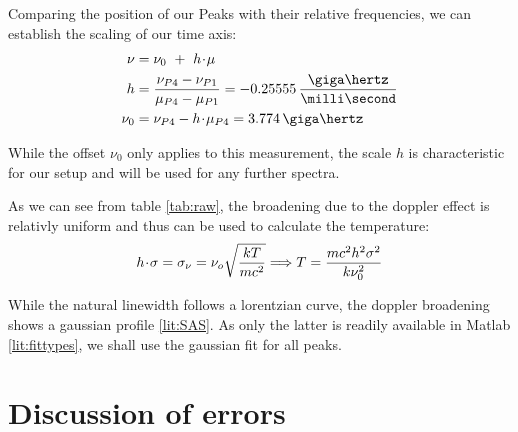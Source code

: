 Comparing the position of our Peaks with their relative frequencies, we can establish the scaling of our time axis:
\begin{align}
	\nu   &= \nu_0 ~+~ h \cdt \mu \\
	 h    &= \frac{\nu_{P4} - \nu_{P1}}{\mu_{P4} - \mu_{P1}} = -0.25555 \,\frac{\giga\hertz}{\milli\second}\\
	\nu_0 &= \nu_{P4} - h \cdt \mu_{P4}  = 3.774 \,\giga\hertz
\end{align}

While the offset $\nu_0$ only applies to this measurement, the scale $h$ is characteristic for our setup and will be used for any further spectra.

As we can see from table \ref{tab:raw}, the broadening due to the doppler effect is relativly uniform and thus can be used to calculate the temperature:
\begin{equation}
 h \!\cdot\! \sigma = \sigma_\nu = \nu_o \sqrt{\frac{k T}{m c^2}} \Longrightarrow T = \frac{m c^2 h^2 \sigma^2}{k\nu_0^2}
\end{equation}








While the natural linewidth follows a lorentzian curve, the doppler broadening shows a gaussian profile \ref{lit:SAS}. As only the latter is readily available in Matlab \ref{lit:fittypes}, we shall use the gaussian fit for all peaks.








\section{Discussion of errors}
